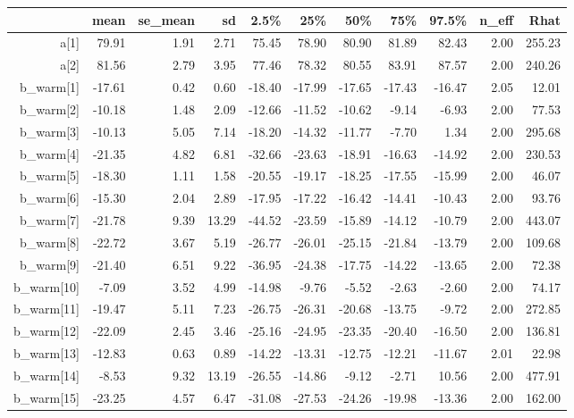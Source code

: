 \documentclass[11pt]{article}
\begin{document}
\begin{table}[ht]
\centering
\begin{tabular}{rrrrrrrrrrr}
  \hline
 & mean & se\_mean & sd & 2.5\% & 25\% & 50\% & 75\% & 97.5\% & n\_eff & Rhat \\ 
  \hline
a[1] & 79.91 & 1.91 & 2.71 & 75.45 & 78.90 & 80.90 & 81.89 & 82.43 & 2.00 & 255.23 \\ 
  a[2] & 81.56 & 2.79 & 3.95 & 77.46 & 78.32 & 80.55 & 83.91 & 87.57 & 2.00 & 240.26 \\ 
  b\_warm[1] & -17.61 & 0.42 & 0.60 & -18.40 & -17.99 & -17.65 & -17.43 & -16.47 & 2.05 & 12.01 \\ 
  b\_warm[2] & -10.18 & 1.48 & 2.09 & -12.66 & -11.52 & -10.62 & -9.14 & -6.93 & 2.00 & 77.53 \\ 
  b\_warm[3] & -10.13 & 5.05 & 7.14 & -18.20 & -14.32 & -11.77 & -7.70 & 1.34 & 2.00 & 295.68 \\ 
  b\_warm[4] & -21.35 & 4.82 & 6.81 & -32.66 & -23.63 & -18.91 & -16.63 & -14.92 & 2.00 & 230.53 \\ 
  b\_warm[5] & -18.30 & 1.11 & 1.58 & -20.55 & -19.17 & -18.25 & -17.55 & -15.99 & 2.00 & 46.07 \\ 
  b\_warm[6] & -15.30 & 2.04 & 2.89 & -17.95 & -17.22 & -16.42 & -14.41 & -10.43 & 2.00 & 93.76 \\ 
  b\_warm[7] & -21.78 & 9.39 & 13.29 & -44.52 & -23.59 & -15.89 & -14.12 & -10.79 & 2.00 & 443.07 \\ 
  b\_warm[8] & -22.72 & 3.67 & 5.19 & -26.77 & -26.01 & -25.15 & -21.84 & -13.79 & 2.00 & 109.68 \\ 
  b\_warm[9] & -21.40 & 6.51 & 9.22 & -36.95 & -24.38 & -17.75 & -14.22 & -13.65 & 2.00 & 72.38 \\ 
  b\_warm[10] & -7.09 & 3.52 & 4.99 & -14.98 & -9.76 & -5.52 & -2.63 & -2.60 & 2.00 & 74.17 \\ 
  b\_warm[11] & -19.47 & 5.11 & 7.23 & -26.75 & -26.31 & -20.68 & -13.75 & -9.72 & 2.00 & 272.85 \\ 
  b\_warm[12] & -22.09 & 2.45 & 3.46 & -25.16 & -24.95 & -23.35 & -20.40 & -16.50 & 2.00 & 136.81 \\ 
  b\_warm[13] & -12.83 & 0.63 & 0.89 & -14.22 & -13.31 & -12.75 & -12.21 & -11.67 & 2.01 & 22.98 \\ 
  b\_warm[14] & -8.53 & 9.32 & 13.19 & -26.55 & -14.86 & -9.12 & -2.71 & 10.56 & 2.00 & 477.91 \\ 
  b\_warm[15] & -23.25 & 4.57 & 6.47 & -31.08 & -27.53 & -24.26 & -19.98 & -13.36 & 2.00 & 162.00 \\ 

\end{tabular}
\end{table}
\end{document}
